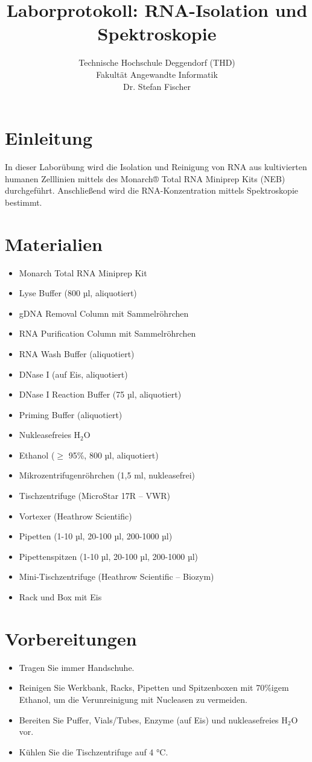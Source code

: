 \documentclass[a4paper,12pt]{article}
\title{Laborprotokoll: RNA-Isolation und Spektroskopie}
\author{Technische Hochschule Deggendorf (THD) \\ Fakultät Angewandte Informatik \\ Dr. Stefan Fischer}
\date{}
\begin{document}
\maketitle

\section*{Einleitung}
In dieser Laborübung wird die Isolation und Reinigung von RNA aus kultivierten humanen Zelllinien mittels des Monarch® Total RNA Miniprep Kits (NEB) durchgeführt. Anschließend wird die RNA-Konzentration mittels Spektroskopie bestimmt.

\section*{Materialien}
\begin{itemize}
    \item Monarch Total RNA Miniprep Kit
    \item Lyse Buffer (800 µl, aliquotiert)
    \item gDNA Removal Column mit Sammelröhrchen
    \item RNA Purification Column mit Sammelröhrchen
    \item RNA Wash Buffer (aliquotiert)
    \item DNase I (auf Eis, aliquotiert)
    \item DNase I Reaction Buffer (75 µl, aliquotiert)
    \item Priming Buffer (aliquotiert)
    \item Nukleasefreies H$_2$O
    \item Ethanol (\(\geq\) 95\%, 800 µl, aliquotiert)
    \item Mikrozentrifugenröhrchen (1,5 ml, nukleasefrei)
    \item Tischzentrifuge (MicroStar 17R – VWR)
    \item Vortexer (Heathrow Scientific)
    \item Pipetten (1-10 µl, 20-100 µl, 200-1000 µl)
    \item Pipettenspitzen (1-10 µl, 20-100 µl, 200-1000 µl)
    \item Mini-Tischzentrifuge (Heathrow Scientific – Biozym)
    \item Rack und Box mit Eis
\end{itemize}

\section*{Vorbereitungen}
\begin{itemize}
    \item Tragen Sie immer Handschuhe.
    \item Reinigen Sie Werkbank, Racks, Pipetten und Spitzenboxen mit 70\%igem Ethanol, um die Verunreinigung mit Nucleasen zu vermeiden.
    \item Bereiten Sie Puffer, Vials/Tubes, Enzyme (auf Eis) und nukleasefreies H$_2$O vor.
    \item Kühlen Sie die Tischzentrifuge auf 4 °C.
\end{itemize}
\end{document}
